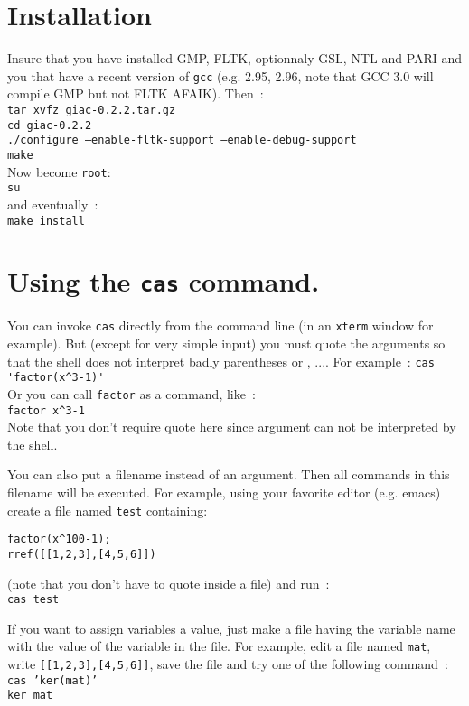 \documentclass{article}
\begin{document}
\section{Installation}
Insure that you have installed GMP, FLTK, optionnaly GSL, NTL and PARI 
and you that have a recent version  of {\tt gcc} (e.g. 2.95, 2.96, note
that GCC 3.0 will compile GMP but not FLTK AFAIK).
Then~:\\
{\tt tar xvfz giac-0.2.2.tar.gz}\\
{\tt cd giac-0.2.2} \\
{\tt ./configure --enable-fltk-support --enable-debug-support} \\
{\tt make}\\
Now become {\tt root}:\\
{\tt su}\\
and eventually~:\\
{\tt make install}

\section{Using the {\tt cas} command.}
You can invoke {\tt cas} directly from the command line (in an {\tt xterm}
window for example). But (except for very simple input) you must
quote the arguments so that the shell does not interpret badly parentheses
or {\tt *}, ....
For example~:
\verb|cas 'factor(x^3-1)'|\\
Or you can call \verb|factor| as a command, like~:\\
\verb|factor x^3-1|\\
Note that you don't require quote here since argument can not be interpreted
by the shell.

You can also put a filename instead of an argument. Then all commands
in this filename will be executed. For example, using your favorite
editor (e.g. emacs) create a file named {\tt test} containing:
\begin{verbatim}
factor(x^100-1);
rref([[1,2,3],[4,5,6]])
\end{verbatim}
(note that you don't have to quote inside a file) and run~:\\
{\tt cas test}

If you want to assign variables a value, just make a file having the
variable name with the value of the variable in the file. For example, edit a
file named {\tt mat}, write {\tt [[1,2,3],[4,5,6]]}, save the file
and try one of the following command~:\\
{\tt cas 'ker(mat)'}\\
{\tt ker mat}
\end{document}

